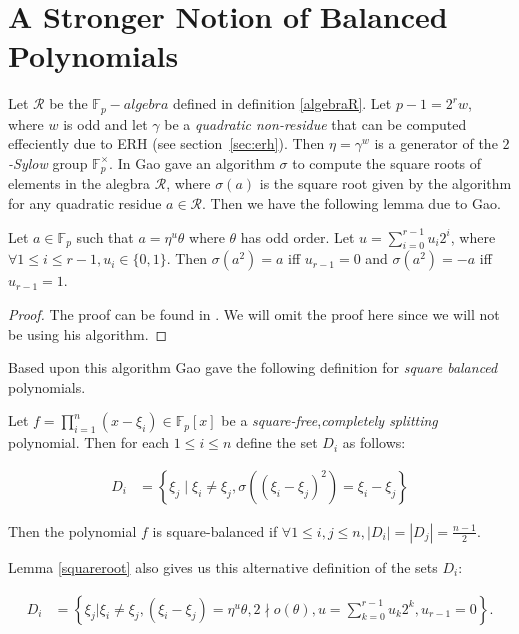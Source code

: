 \section{A Stronger Notion of Balanced Polynomials}\label{sec:stronger}
Let $\mathcal{R}$ be the $\mathbb{F}_p-algebra$ defined in definition \ref{algebraR}. Let
$p-1=2^rw$, where $w$ is odd and let $\gamma$ be a \emph{quadratic non-residue} that can be computed effeciently due to ERH (see section~\ref{sec:erh}). Then $\eta=\gamma^w$ is a generator of the \emph{$2$-Sylow} group $\mathbb{F}_p^\times$.
In \cite{gao2001deterministic} Gao gave an algorithm $\sigma$ to compute the square roots of elements in the alegbra $\mathcal{R}$, where $\sigma(a)$ is the square root given by the algorithm for any quadratic residue $a \in
\mathcal{R}$. Then we have the following lemma due to Gao.

\begin{lemma}\label{squareroot}
	Let $a \in \mathbb{F}_p$ such that $a=\eta^u\theta$ where $\theta$ has odd order. Let $u = \sum_{i=0}^{r-1} u_i2^i$, where $\forall 1 \le i \le r-1, u_i \in \{0,1\}$. Then $\sigma(a^2)=a$ iff $u_{r-1}=0$ and 
	$\sigma(a^2)=-a$ iff $u_{r-1}=1$.
\end{lemma}

\begin{proof}The proof can be found in \cite{gao2001deterministic}. We will omit the proof here since we will not be using his algorithm.
\end{proof}

Based upon this algorithm Gao gave the following definition for \emph{square balanced} polynomials.

\begin{definition}\label{squarebalance}
	Let $f=\prod_{i=1}^n (x-\xi_i) \in \mathbb{F}_p[x]$ be a \emph{square-free},\emph{completely splitting} polynomial. Then for each $1 \le i \le n$ define the set $D_i$ as follows:

	\begin{align*}
		D_i &= \left\{\xi_j \mid \xi_i\neq \xi_j,
		\sigma( (\xi_i-\xi_j)^2)=\xi_i-\xi_j\right\}
	\end{align*}

	Then the polynomial $f$ is square-balanced if $\forall 1 \le i,j \le n, |D_i|=|D_j|=\frac{n-1}{2}$.
\end{definition}

\noindent
Lemma \ref{squareroot} also gives us this alternative definition of the sets 
$D_i$:

\begin{align*}
	D_i &= \left\{\xi_j |\xi_i \neq \xi_j,(\xi_i-\xi_j)= \eta^u \theta,2\nmid o(\theta),u=\sum_{k=0}^{r-1}u_k2^k,u_{r-1}=0\right\}.
\end{align*}

